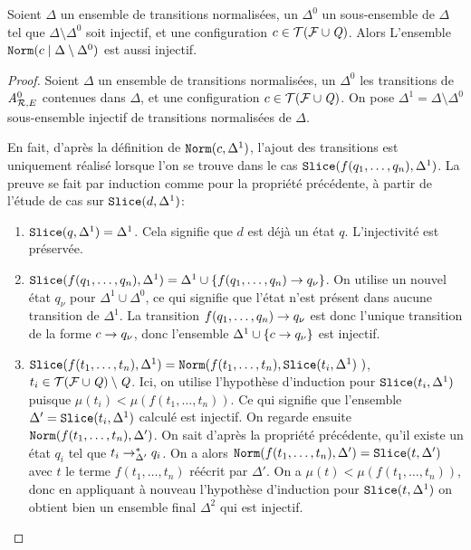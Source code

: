  \begin{property}
   \label{prop:norm_injectivity}
   Soient $\Delta$ un ensemble de transitions normalisées, un $\Delta^0$ un sous-ensemble 
   de $\Delta$ tel que $\Delta \setminus \Delta^0$ soit injectif, et une configuration $c \in \mathcal{ T(F \cup \mathit Q)}$.
   Alors L'ensemble $\mathtt{Norm}(c \; | \; \Delta \setminus \Delta^0)$ est aussi injectif.
 \end{property}

 \begin{proof}
   Soient $\Delta$ un ensemble de transitions normalisées, un $\Delta^0$ les transitions de ${\mathit A}_{\mathcal R,E}^0$ contenues dans
   $\Delta$, et une configuration $c \in \mathcal{ T(F \cup \mathit Q)}$.
   On pose $\Delta^1 = \Delta \setminus \Delta^0$ sous-ensemble injectif de transitions normalisées de $\Delta$.
   
   En fait, d'après la définition de $\mathtt{Norm}(c, \Delta^1)$, l'ajout des transitions est 
   uniquement réalisé lorsque l'on se trouve dans le cas $\mathtt{Slice}(f(q_1,\dots,q_n), \Delta^1)$.
   La preuve se fait par induction comme pour la propriété précédente, à partir de l'étude de cas sur $\mathtt{Slice}(d, \Delta^1)$:

   \begin{enumerate}
   \item $\mathtt{Slice}(q, \Delta^1) = \Delta^1$. Cela signifie que $d$ est déjà un état $q$. L'injectivité est préservée.
     
   \item $\mathtt{Slice}(f(q_1, \dots, q_n), \Delta^1) = \Delta^1 \cup \{ f(q_1, \dots, q_n) \rightarrow q_\nu\}$.
     On utilise un nouvel état $q_\nu$ pour $\Delta^1 \cup \Delta^0$, ce qui signifie que l'état n'est présent dans aucune transition
     de $\Delta^1$. La transition $f(q_1, \dots, q_n) \rightarrow q_\nu$ est donc l'unique transition de la forme $c \rightarrow q_\nu$,
     donc l'ensemble $\Delta^1 \cup \{ c \rightarrow q_\nu\}$ est injectif.

   \item $\mathtt{Slice}(f(t_1, \dots, t_n), \Delta^1) = \mathtt{Norm}(f(t_1,\dots, t_n), \mathtt{Slice}(t_i, \Delta^1)\ )$, $t_i \in \mathcal{ T(F \cup \mathit Q)} \setminus \mathit Q$.
     Ici, on utilise l'hypothèse d'induction pour $\mathtt{Slice}(t_i, \Delta^1)$ puisque $\mu (t_i) < \mu(f(t_1, \dots, t_n))$.
     Ce qui signifie que l'ensemble $\Delta' = \mathtt{Slice}(t_i, \Delta^1)$ calculé est injectif.
     On regarde ensuite $\mathtt{Norm}(f(t_1,\dots, t_n), \Delta')$. On sait d'après la propriété précédente, qu'il existe
     un état $q_i$ tel que $t_i \rightarrow^*_{\Delta'} q_i$. On a alors $\mathtt{Norm}(f(t_1,\dots, t_n), \Delta') = \mathtt{Slice}(t, \Delta')$
     avec $t$ le terme $f(t_1,\dots, t_n)$ réécrit par $\Delta'$. On a $\mu (t) < \mu(f(t_1, \dots, t_n))$, donc en
     appliquant à nouveau l'hypothèse d'induction pour $\mathtt{Slice}(t, \Delta^1)$ on obtient bien un ensemble final $\Delta^2$ qui est injectif.
   \end{enumerate}

\end{proof}

